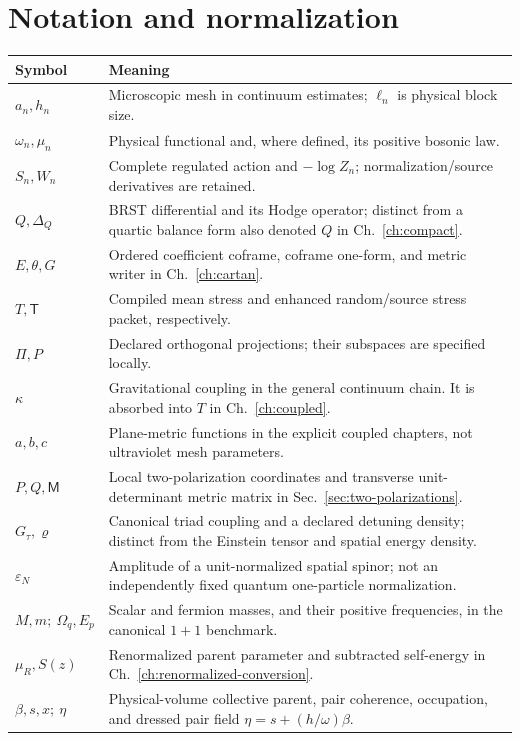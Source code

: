 \documentclass[11pt,a4paper,oneside]{book}
\theoremstyle{plain}
\theoremstyle{definition}
\theoremstyle{remark}
\begin{document}
\section{Notation and normalization}
\begin{center}
\begin{tabularx}{\textwidth}{@{}lX@{}}
\toprule
Symbol & Meaning\\
\midrule
$a_n,h_n$ & Microscopic mesh in continuum estimates; $\ell_n$ is physical block size.\\
$\omega_n,\mu_n$ & Physical functional and, where defined, its positive bosonic law.\\
$S_n,W_n$ & Complete regulated action and $-\log Z_n$; normalization/source derivatives are retained.\\
$Q,\Delta_Q$ & BRST differential and its Hodge operator; distinct from a quartic balance form also denoted $Q$ in Ch.~\ref{ch:compact}.\\
$E,\theta,G$ & Ordered coefficient coframe, coframe one-form, and metric writer in Ch.~\ref{ch:cartan}.\\
$T,\mathsf T$ & Compiled mean stress and enhanced random/source stress packet, respectively.\\
$\Pi,P$ & Declared orthogonal projections; their subspaces are specified locally.\\
$\kappa$ & Gravitational coupling in the general continuum chain. It is absorbed into $T$ in Ch.~\ref{ch:coupled}.\\
$a,b,c$ & Plane-metric functions in the explicit coupled chapters, not ultraviolet mesh parameters.\\
$P,Q,\mathsf M$ & Local two-polarization coordinates and transverse unit-determinant metric matrix in Sec.~\ref{sec:two-polarizations}.\\
$G_\tau,\varrho$ & Canonical triad coupling and a declared detuning density; distinct from the Einstein tensor and spatial energy density.\\
$\varepsilon_N$ & Amplitude of a unit-normalized spatial spinor; not an independently fixed quantum one-particle normalization.\\
$M,m;\ \Omega_q,E_p$ & Scalar and fermion masses, and their positive frequencies, in the canonical $1+1$ benchmark.\\
$\mu_R,S(z)$ & Renormalized parent parameter and subtracted self-energy in Ch.~\ref{ch:renormalized-conversion}.\\
$\beta,s,x;\ \eta$ & Physical-volume collective parent, pair coherence, occupation, and dressed pair field $\eta=s+(h/\omega)\beta$.\\

\end{tabularx}
\end{center}
\end{document}
